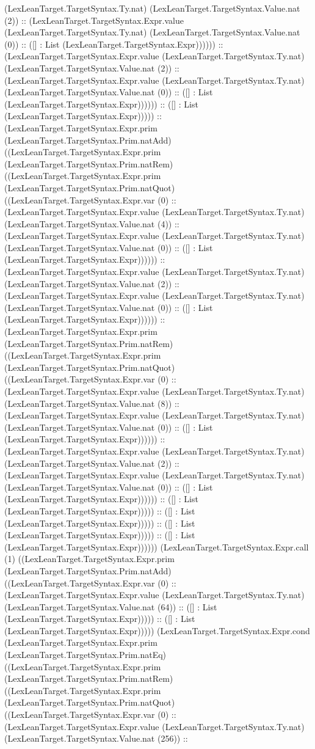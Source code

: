 \documentclass[11pt]{article}
\begin{document}
(LexLeanTarget.TargetSyntax.Ty.nat) (LexLeanTarget.TargetSyntax.Value.nat (2)) :: (LexLeanTarget.TargetSyntax.Expr.value (LexLeanTarget.TargetSyntax.Ty.nat) (LexLeanTarget.TargetSyntax.Value.nat (0)) :: ([] : List (LexLeanTarget.TargetSyntax.Expr)))))) :: (LexLeanTarget.TargetSyntax.Expr.value (LexLeanTarget.TargetSyntax.Ty.nat) (LexLeanTarget.TargetSyntax.Value.nat (2)) :: (LexLeanTarget.TargetSyntax.Expr.value (LexLeanTarget.TargetSyntax.Ty.nat) (LexLeanTarget.TargetSyntax.Value.nat (0)) :: ([] : List (LexLeanTarget.TargetSyntax.Expr)))))) :: ([] : List (LexLeanTarget.TargetSyntax.Expr))))) :: (LexLeanTarget.TargetSyntax.Expr.prim (LexLeanTarget.TargetSyntax.Prim.natAdd) ((LexLeanTarget.TargetSyntax.Expr.prim (LexLeanTarget.TargetSyntax.Prim.natRem) ((LexLeanTarget.TargetSyntax.Expr.prim (LexLeanTarget.TargetSyntax.Prim.natQuot) ((LexLeanTarget.TargetSyntax.Expr.var (0) :: (LexLeanTarget.TargetSyntax.Expr.value (LexLeanTarget.TargetSyntax.Ty.nat) (LexLeanTarget.TargetSyntax.Value.nat (4)) :: (LexLeanTarget.TargetSyntax.Expr.value (LexLeanTarget.TargetSyntax.Ty.nat) (LexLeanTarget.TargetSyntax.Value.nat (0)) :: ([] : List (LexLeanTarget.TargetSyntax.Expr)))))) :: (LexLeanTarget.TargetSyntax.Expr.value (LexLeanTarget.TargetSyntax.Ty.nat) (LexLeanTarget.TargetSyntax.Value.nat (2)) :: (LexLeanTarget.TargetSyntax.Expr.value (LexLeanTarget.TargetSyntax.Ty.nat) (LexLeanTarget.TargetSyntax.Value.nat (0)) :: ([] : List (LexLeanTarget.TargetSyntax.Expr)))))) :: (LexLeanTarget.TargetSyntax.Expr.prim (LexLeanTarget.TargetSyntax.Prim.natRem) ((LexLeanTarget.TargetSyntax.Expr.prim (LexLeanTarget.TargetSyntax.Prim.natQuot) ((LexLeanTarget.TargetSyntax.Expr.var (0) :: (LexLeanTarget.TargetSyntax.Expr.value (LexLeanTarget.TargetSyntax.Ty.nat) (LexLeanTarget.TargetSyntax.Value.nat (8)) :: (LexLeanTarget.TargetSyntax.Expr.value (LexLeanTarget.TargetSyntax.Ty.nat) (LexLeanTarget.TargetSyntax.Value.nat (0)) :: ([] : List (LexLeanTarget.TargetSyntax.Expr)))))) :: (LexLeanTarget.TargetSyntax.Expr.value (LexLeanTarget.TargetSyntax.Ty.nat) (LexLeanTarget.TargetSyntax.Value.nat (2)) :: (LexLeanTarget.TargetSyntax.Expr.value (LexLeanTarget.TargetSyntax.Ty.nat) (LexLeanTarget.TargetSyntax.Value.nat (0)) :: ([] : List (LexLeanTarget.TargetSyntax.Expr)))))) :: ([] : List (LexLeanTarget.TargetSyntax.Expr))))) :: ([] : List (LexLeanTarget.TargetSyntax.Expr))))) :: ([] : List (LexLeanTarget.TargetSyntax.Expr))))) :: ([] : List (LexLeanTarget.TargetSyntax.Expr)))))) (LexLeanTarget.TargetSyntax.Expr.call (1) ((LexLeanTarget.TargetSyntax.Expr.prim (LexLeanTarget.TargetSyntax.Prim.natAdd) ((LexLeanTarget.TargetSyntax.Expr.var (0) :: (LexLeanTarget.TargetSyntax.Expr.value (LexLeanTarget.TargetSyntax.Ty.nat) (LexLeanTarget.TargetSyntax.Value.nat (64)) :: ([] : List (LexLeanTarget.TargetSyntax.Expr))))) :: ([] : List (LexLeanTarget.TargetSyntax.Expr))))) (LexLeanTarget.TargetSyntax.Expr.cond (LexLeanTarget.TargetSyntax.Expr.prim (LexLeanTarget.TargetSyntax.Prim.natEq) ((LexLeanTarget.TargetSyntax.Expr.prim (LexLeanTarget.TargetSyntax.Prim.natRem) ((LexLeanTarget.TargetSyntax.Expr.prim (LexLeanTarget.TargetSyntax.Prim.natQuot) ((LexLeanTarget.TargetSyntax.Expr.var (0) :: (LexLeanTarget.TargetSyntax.Expr.value (LexLeanTarget.TargetSyntax.Ty.nat) (LexLeanTarget.TargetSyntax.Value.nat (256)) :: 
\end{document}

